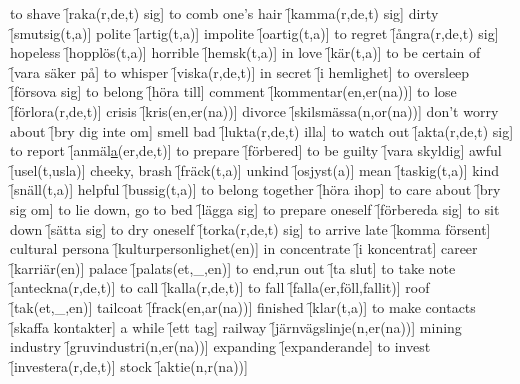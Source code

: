 \begin{questions}
\begin{multicols}{2}
        \question to shave \f[raka(r,de,t) sig]
        \question to comb one's hair \f[kamma(r,de,t) sig]
        \question dirty \f[smutsig(t,a)]
        \question polite \f[artig(t,a)]
        \question impolite \f[oartig(t,a)]
        \question to regret \f[ångra(r,de,t) sig]
        \question hopeless \f[hopplös(t,a)]
        \question horrible \f[hemsk(t,a)]
        \question in love \f[kär(t,a)]
        \question to be certain of \f[vara säker på]
        \question to whisper \f[viska(r,de,t)]
        \question in secret \f[i hemlighet]
        \question to oversleep \f[försova sig]
        \question to belong \f[höra till]
        \question comment \f[kommentar(en,er(na))]
        \question to lose \f[förlora(r,de,t)]
        \question crisis \f[kris(en,er(na))]
        \question divorce \f[skilsmässa(n,or(na))]
        \question don't worry about \f[bry dig inte om]
        \question smell bad \f[lukta(r,de,t) illa]
        \question to watch out \f[akta(r,de,t) sig]
        \question to report \f[anmäl\underline{a}(er,de,t)]
        \question to prepare \f[förbered]
        \question to be guilty \f[vara skyldig]
        \question awful \f[usel(t,usla)]
        \question cheeky, brash \f[fräck(t,a)]
        \question unkind \f[osjyst(a)]
        \question mean \f[taskig(t,a)]
        \question kind \f[snäll(t,a)]
        \question helpful \f[bussig(t,a)]
        \question to belong together \f[höra ihop]
        \question to care about \f[bry sig om]
        \question to lie down, go to bed \f[lägga sig]
        \question to prepare oneself \f[förbereda sig]
        \question to sit down \f[sätta sig]
        \question to dry oneself \f[torka(r,de,t) sig]
        \question to arrive late \f[komma försent]
        \question cultural persona \f[kulturpersonlighet(en)]
        \question in concentrate \f[i koncentrat]
        \question career \f[karriär(en)]
        \question palace \f[palats(et,\_,en)]
        \question to end,run out \f[ta slut]
        \question to take note \f[anteckna(r,de,t)]
        \question to call \f[kalla(r,de,t)]
        \question to fall \f[falla(er,föll,fallit)]
        \question roof \f[tak(et,\_,en)]
        \question tailcoat \f[frack(en,ar(na))]
        \question finished \f[klar(t,a)]
        \question to make contacts \f[skaffa kontakter]
        \question a while \f[ett tag]
        \question railway \f[järnvägslinje(n,er(na))]
        \question mining industry \f[gruvindustri(n,er(na))]
        \question expanding \f[expanderande]
        \question to invest \f[investera(r,de,t)]
        \question stock \f[aktie(n,r(na))]

\end{multicols}
\end{questions}
